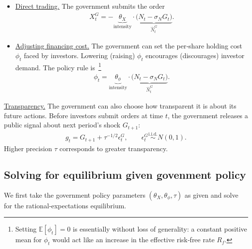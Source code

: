 \documentclass[12pt]{article}
\begin{document}
\begin{itemize}
    \item \underline{Direct trading.} The government submits the order
    \begin{align}
        X_t^G = - \underbrace{\theta_X}_{\text{intensity}} \cdot \underbrace{\bigl(N_t - \sigma_N G_t\bigr)}_{\hat{N}_t^G}. \label{govt_demand}
    \end{align}

    \item \underline{Adjusting financing cost.} The government can set the per‑share holding cost \(\phi_t\) faced by investors. Lowering (raising) \(\phi_t\) encourages (discourages) investor demand. The policy rule is~\footnote{Setting \(\mathbb{E}[\phi_t]=0\) is essentially without loss of generality: a constant positive mean for \(\phi_t\) would act like an increase in the effective risk‑free rate \(R_f\).}
    \begin{align}
        \phi_t = \underbrace{\theta_\phi}_{\text{intensity}} \cdot \underbrace{\bigl(N_t - \sigma_N G_t\bigr)}_{\hat{N}_t^G}. \label{phi}
    \end{align}
\end{itemize}

\underline{Transparency.}
The government can also choose how transparent it is about its future actions. Before investors submit orders at time \(t\), the government releases a public signal about next period's shock \(G_{t+1}\):
\begin{align*}
    g_t = G_{t+1} + \tau^{-1/2} \epsilon_t^G, \qquad \epsilon_t^G \stackrel{\text{i.i.d.}}{\sim} N(0,1).
\end{align*}
Higher precision \(\tau\) corresponds to greater transparency. 

\subsection{Solving for equilibrium given govenment policy}

We first take the government policy parameters \((\theta_X, \theta_\phi, \tau)\) as given and solve for the rational‑expectations equilibrium.
\end{document}
